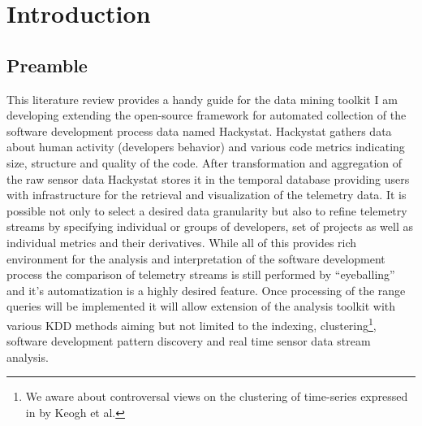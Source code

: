 \chapter{Introduction}
\section{Preamble}
This literature review provides a handy guide for the data mining toolkit I am developing extending the open-source framework for automated collection of the software development process data named Hackystat. Hackystat gathers data about human activity (developers behavior) and various code metrics indicating size, structure and quality of the code. After transformation and aggregation of the raw sensor data Hackystat stores it in the temporal database providing users with infrastructure for the retrieval and visualization of the telemetry data. It is possible not only to select a desired data granularity but also to refine telemetry streams by specifying individual or groups of developers, set of projects as well as individual metrics and their derivatives. While all of this provides rich environment for the analysis and interpretation of the software development process the comparison of telemetry streams is still performed by ``eyeballing'' and it's automatization is a highly desired feature. Once processing of the range queries will be implemented it will allow extension of the analysis toolkit with various KDD methods aiming but not limited to the indexing, clustering\footnote{We aware about controversal views on the clustering of time-series expressed in \cite{citeulike:227029} by Keogh et al.}, software development pattern discovery and real time sensor data stream analysis.

